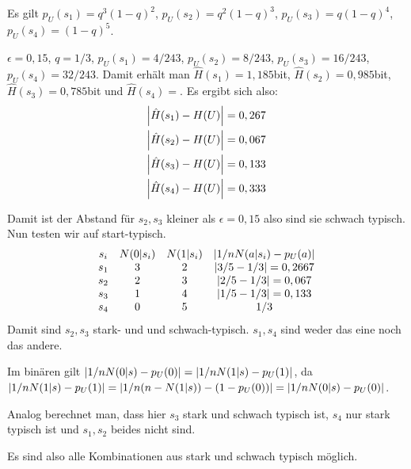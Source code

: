 \documentclass{article}
\begin{document}
\begin{solution}
    Es gilt $p_U(s_1)=q^3{(1-q)}^2$, $p_U(s_2)=q^2{(1-q)}^3$, $p_U(s_3)=q{(1-q)}^4$, $p_U(s_4)={(1-q)}^5$.
    \begin{tasks}
            \item $\epsilon=0,15$, $q=1/3$, $p_U(s_1)=4/243$, $p_U(s_2)=8/243$, $p_U(s_3)=16/243$, $p_U(s_4)=32/243$.
        Damit erhält man $\hat H(s_1)=1,185$bit, $\hat H(s_2)=0,985$bit, $\hat H(s_3)=0,785$bit und $\hat H(s_4)=$. Es ergibt sich also:
        \begin{align*}
            \left|\hat H(s_1)-H(U)\right|&=0,267\\
            \left|\hat H(s_2)-H(U)\right|&=0,067\\
            \left|\hat H(s_3)-H(U)\right|&=0,133\\
            \left|\hat H(s_4)-H(U)\right|&=0,333
        \end{align*}
    
    Damit ist der Abstand für $s_2, s_3$ kleiner als $\epsilon=0,15$ also sind sie schwach typisch.
    Nun testen wir auf start-typisch.
    \begin{align*}
        \begin{matrix}
            s_i & N(0|s_i) & N(1|s_i) & \left|1/n N(a|s_i)-p_U(a)\right|\\
            s_1 & 3 & 2 & \left|3/5-1/3\right|=0,2667\\ 
            s_2 & 2 & 3 & \left|2/5-1/3\right|=0,067\\
            s_3 & 1 & 4 & \left|1/5-1/3\right|=0,133\\
            s_4 & 0 & 5 & 1/3
        \end{matrix}
    \end{align*}
    Damit sind $s_2,s_3$ stark- und und schwach-typisch. $s_1,s_4$ sind weder das eine noch das andere.
    \begin{remark}
        Im binären gilt $\left|1/n N(0|s)-p_U(0)\right|=\left|1/n N(1|s)-p_U(1)\right|$, da $\left|1/nN(1|s)-p_U(1)\right|=\left|1/n(n-N(1|s))-(1-p_U(0))\right|=\left|1/n N(0|s)-p_U(0)\right|$.
    \end{remark}
    \item Analog berechnet man, dass hier $s_3$ stark und schwach typisch ist, $s_4$ nur stark typisch ist und $s_1,s_2$ beides nicht sind.
\begin{remark}
    Es sind also alle Kombinationen aus stark und schwach typisch möglich.
\end{remark}
\end{tasks}
\end{solution}
\end{document}
